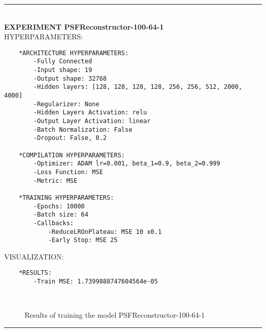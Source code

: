 \rule{0.5\textwidth}{0.5pt}\\

	{\large \textbf{EXPERIMENT PSFReconstructor-100-64-1}}\\
	
	{\normalsize HYPERPARAMETERS:}
	\begin{lstlisting}
	*ARCHITECTURE HYPERPARAMETERS:
		-Fully Connected
		-Input shape: 19
		-Output shape: 32768
		-Hidden layers: [128, 128, 128, 128, 256, 256, 512, 2000, 4000]
		-Regularizer: None
		-Hidden Layers Activation: relu
		-Output Layer Activation: linear
		-Batch Normalization: False
		-Dropout: False, 0.2
	
	*COMPILATION HYPERPARAMETERS:
		-Optimizer: ADAM lr=0.001, beta_1=0.9, beta_2=0.999
		-Loss Function: MSE
		-Metric: MSE
	
	*TRAINING HYPERPARAMETERS:
		-Epochs: 10000
		-Batch size: 64
		-Callbacks: 
			-ReduceLROnPlateau: MSE 10 x0.1
			-Early Stop: MSE 25
	\end{lstlisting}
	
	{\normalsize VISUALIZATION:}
	\begin{lstlisting}
	*RESULTS:
        -Train MSE: 1.7399888747604564e-05
	\end{lstlisting}
	
	\begin{figure*}[ht!]
		\hspace{\fill}
		\hspace{\fill}	
		\\
		\caption{Results of training the model PSFReconstructor-100-64-1}
	\end{figure*}
	
\FloatBarrier	
\rule{0.5\textwidth}{0.5pt}\\
